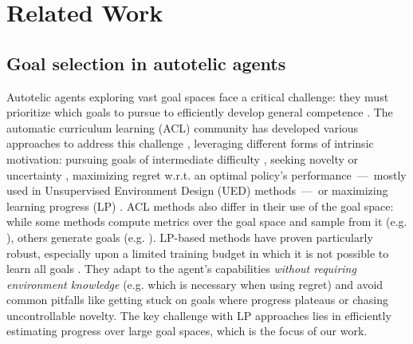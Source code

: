 \documentclass{article}
\begin{document}
\section{Related Work}
\label{sec:related_work}

\subsection{Goal selection in autotelic agents}
Autotelic agents exploring vast goal spaces face a critical challenge: they must prioritize which goals to pursue to efficiently develop general competence \citep{colas_autotelic_2022}. The automatic curriculum learning (ACL) community has developed various approaches to address this challenge \cite{portelas_automatic_2020}, leveraging different forms of intrinsic motivation: pursuing goals of intermediate difficulty \citep{florensa_automatic_2018,racaniere_automated_2020, castanetSL23}, seeking novelty or uncertainty \cite{warde-farley_unsupervised_2018,pong_skew-fit_2020,pitis_maximum_2020}, maximizing regret w.r.t. an optimal policy's performance \,---\, mostly used in Unsupervised Environment Design (UED) methods \cite{dennis_emergent_2020, jiang_replay-guided_2021}\,---\, or maximizing learning progress (LP) \cite{stout_competence_2010,matiisen_teacher-student_2017,fournier_accuracy-based_2018,portelas_teacher_2019,colas_curious_2019, kanitscheider_multi-task_2021,kovac_grimgep_2023,zhang_omni_2024}. ACL methods also differ in their use of the goal space: while some methods compute metrics over the goal space and sample from it (e.g. \cite{matiisen_teacher-student_2017, kanitscheider_multi-task_2021, portelas_teacher_2019}), others generate goals (e.g. \cite{florensa_automatic_2018, castanetSL23, dennis_emergent_2020}). LP-based methods have proven particularly robust, especially upon a limited training budget in which it is not possible to learn all goals \cite{lopes_strategic_2012}.  They adapt to the agent's capabilities \textit{without requiring environment knowledge} (e.g. which is necessary when using regret) and avoid common pitfalls like getting stuck on goals where progress plateaus or chasing uncontrollable novelty. The key challenge with LP approaches lies in efficiently estimating progress over large goal spaces, which is the focus of our work.
\end{document}
